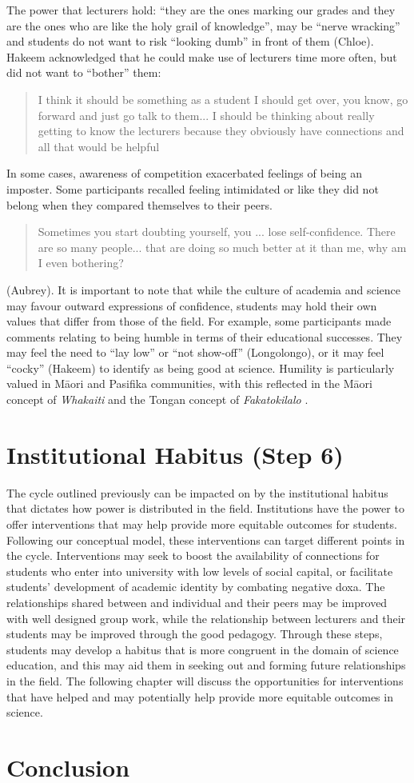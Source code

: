 The power that lecturers hold: ``they are the ones marking our grades and they are the ones who are like the holy grail of knowledge'', may be ``nerve wracking'' and students do not want to risk ``looking dumb'' in front of them (Chloe). Hakeem acknowledged that he could make use of lecturers time more often, but did not want to ``bother''  them: \blockquote{I think it should be something as a student I should get over, you know, go forward and just go talk to them... I should be thinking about really getting to know the lecturers because they obviously have connections and all that would be helpful}. 

In some cases, awareness of competition exacerbated feelings of being an imposter. Some participants recalled feeling intimidated or like they did not belong when they compared themselves to their peers. \blockquote{Sometimes you start doubting yourself, you ... lose self-confidence. There are so many people... that are doing so much better at it than me, why am I even bothering?} (Aubrey). It is important to note that while the culture of academia and science may favour outward expressions of confidence, students may hold their own values that differ from those of the field. For example, some participants made comments relating to being humble in terms of their educational successes. They may feel the need to ``lay low'' or ``not show-off'' (Longolongo), or it may feel ``cocky'' (Hakeem) to identify as being good at science. Humility is particularly valued in M\={a}ori and Pasifika communities, with this reflected in the M\={a}ori concept of \textit{Whakaiti} \cite{haar2018indigenous} and the Tongan concept of \textit{Fakatokilalo} \cite{mafile2004exploring}. 

\section{Institutional Habitus (Step 6)}
The cycle outlined previously can be impacted on by the institutional habitus that dictates how power is distributed in the field. Institutions have the power to offer interventions that may help provide more equitable outcomes for students. Following our conceptual model, these interventions can target different points in the cycle. Interventions may seek to boost the availability of connections for students who enter into university with low levels of social capital, or facilitate students' development of academic identity by combating negative doxa. The relationships shared between and individual and their peers may be improved with well designed group work, while the relationship between lecturers and their students may be improved through the good pedagogy. Through these steps, students may develop a habitus that is more congruent in the domain of science education, and this may aid them in seeking out and forming future relationships in the field. The following chapter will discuss the opportunities for interventions that have helped and may potentially help provide more equitable outcomes in science. 

\section{Conclusion}



